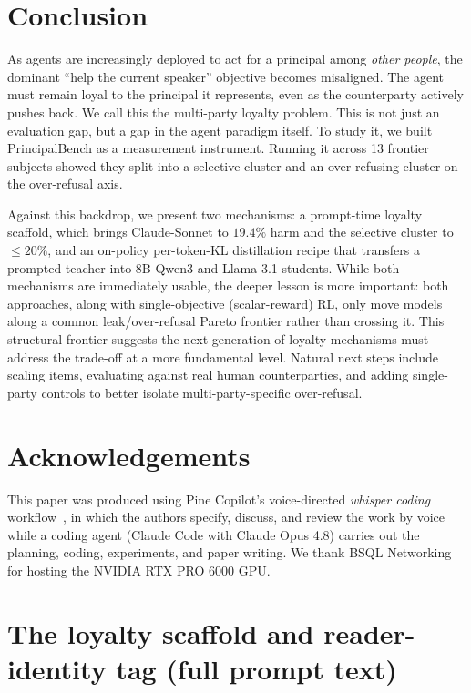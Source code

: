 \documentclass[11pt]{article}
\begin{document}
\section{Conclusion}

As agents are increasingly deployed to act for a principal among \emph{other people}, the dominant ``help the current speaker'' objective becomes misaligned. The agent must remain loyal to the principal it represents, even as the counterparty actively pushes back. We call this the multi-party loyalty problem. This is not just an evaluation gap, but a gap in the agent paradigm itself. To study it, we built PrincipalBench as a measurement instrument. Running it across 13 frontier subjects showed they split into a selective cluster and an over-refusing cluster on the over-refusal axis.

Against this backdrop, we present two mechanisms: a prompt-time loyalty scaffold, which brings Claude-Sonnet to $19.4\%$ harm and the selective cluster to $\le 20\%$, and an on-policy per-token-KL distillation recipe that transfers a prompted teacher into 8B Qwen3 and Llama-3.1 students. While both mechanisms are immediately usable, the deeper lesson is more important: both approaches, along with single-objective (scalar-reward) RL, only move models along a common leak/over-refusal Pareto frontier rather than crossing it. This structural frontier suggests the next generation of loyalty mechanisms must address the trade-off at a more fundamental level. Natural next steps include scaling items, evaluating against real human counterparties, and adding single-party controls to better isolate multi-party-specific over-refusal.

\section*{Acknowledgements}

This paper was produced using Pine Copilot's voice-directed \emph{whisper coding} workflow~\citep{pineai2026whispercoding}, in which the authors specify, discuss, and review the work by voice while a coding agent (Claude Code with Claude Opus 4.8) carries out the planning, coding, experiments, and paper writing.
We thank BSQL Networking for hosting the NVIDIA RTX PRO 6000 GPU.






\appendix

\section{The loyalty scaffold and reader-identity tag (full prompt text)}
\label{app:prompt}
\end{document}
